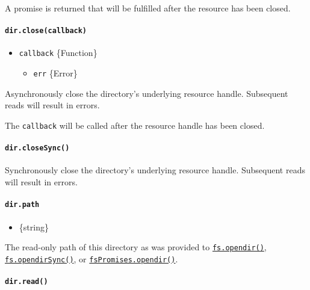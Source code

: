 A promise is returned that will be fulfilled after the resource has been
closed.

\paragraph{\texorpdfstring{\texttt{dir.close(callback)}}{dir.close(callback)}}\label{dir.closecallback}

\begin{itemize}
\tightlist
\item
  \texttt{callback} \{Function\}

  \begin{itemize}
  \tightlist
  \item
    \texttt{err} \{Error\}
  \end{itemize}
\end{itemize}

Asynchronously close the directory's underlying resource handle.
Subsequent reads will result in errors.

The \texttt{callback} will be called after the resource handle has been
closed.

\paragraph{\texorpdfstring{\texttt{dir.closeSync()}}{dir.closeSync()}}\label{dir.closesync}

Synchronously close the directory's underlying resource handle.
Subsequent reads will result in errors.

\paragraph{\texorpdfstring{\texttt{dir.path}}{dir.path}}\label{dir.path}

\begin{itemize}
\tightlist
\item
  \{string\}
\end{itemize}

The read-only path of this directory as was provided to
\hyperref[fsopendirpath-options-callback]{\texttt{fs.opendir()}},
\hyperref[fsopendirsyncpath-options]{\texttt{fs.opendirSync()}}, or
\hyperref[fspromisesopendirpath-options]{\texttt{fsPromises.opendir()}}.

\paragraph{\texorpdfstring{\texttt{dir.read()}}{dir.read()}}\label{dir.read}

